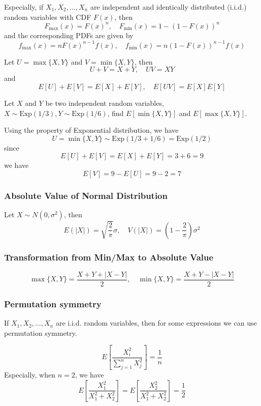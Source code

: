 \documentclass{template}
\newcommand{\Exponential}{\text{Exp}}
\begin{document}
Especially, if \( X_1, X_2, \ldots, X_n \) are independent and identically distributed (i.i.d.) random
variables with CDF \( F(x) \), then
\[
F_{\max}(x) = F(x)^n, \quad F_{\min}(x) = 1 - (1-F(x))^n
\] 
and the corresponding PDFs are given by
\[
	f_{\max}(x) = n F(x)^{n-1} f(x), \quad f_{\min}(x) = n (1-F(x))^{n-1} f(x)
\] 

\begin{theorem}
	Let $U=\max\{X, Y\}$ and $V=\min\{X, Y\}$, then
	\[
	U+V = X+Y, \quad UV = XY
	\] 
	and 
	\[
		E[U] + E[V] = E[X] + E[Y], \quad E[UV] = E[X]E[Y]
	\] 
\end{theorem}
\begin{example}
	Let $X$ and $Y$ be two independent random variables, $X\sim \Exponential(1 / 3), Y\sim \Exponential(1 / 6)$,
	find $E[\min\{X, Y\}]$ and $E[\max\{X, Y\}]$.
	\begin{answer}
		Using the property of Exponential distribution, we have
		\[
			U = \min\{X, Y\} \sim \Exponential(1/3 + 1/6) = \Exponential(1/2)
		\] 
		since
		\[
			E[U] + E[V] = E[X] + E[Y] = 3 + 6 = 9
		\] 
		we have
		\[
			E[V] = 9 - E[U] = 9 - 2 = 7
		\] 
	\end{answer}
\end{example}

\subsubsection{Absolute Value of Normal Distribution}
\begin{theorem} Let \( X \sim N(0, \sigma^2) \), then
	\[
		E(|X|) = \sqrt{\frac{2}{\pi}}\sigma, \quad V(|X|) = \left(1 - \frac{2}{\pi}\right)\sigma^2
	\] 
\end{theorem}

\subsubsection{Transformation from Min/Max to Absolute Value}
\[
	\max\{X, Y\} = \frac{X+Y+|X-Y|}{2}, \quad \min\{X, Y\} = \frac{X+Y-|X-Y|}{2}
\] 
\subsubsection{Permutation symmetry}
If \( X_1, X_2, \ldots, X_n \) are i.i.d. random variables, then 
for some expressions we can use permutation symmetry.
\begin{theorem}
	\[
		E\left[\frac{X_i^2}{\sum_{j=1}^{n} X_j^2}\right] = \frac{1}{n}
	\] 
	Especially, when \( n=2 \), we have
\[
		E\left[\frac{X_1^2}{X_1^2+X_2^2}\right] = E\left[\frac{X_2^2}{X_1^2+X_2^2}\right] = \frac{1}{2}
\] 
\end{theorem}
\end{document}
